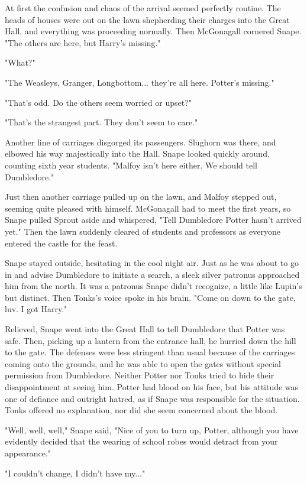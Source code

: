 \documentclass[a4paper,11pt]{article}
\begin{document}
At first the confusion and chaos of the arrival seemed perfectly routine. The heads of houses were out on the lawn shepherding their charges into the Great Hall, and everything was proceeding normally. Then McGonagall cornered Snape. "The others are here, but Harry's missing."

"What?"

"The Weasleys, Granger, Longbottom... they're all here. Potter's missing."

"That's odd. Do the others seem worried or upset?"

"That's the strangest part. They don't seem to care."

Another line of carriages disgorged its passengers. Slughorn was there, and elbowed his way majestically into the Hall. Snape looked quickly around, counting sixth year students. "Malfoy isn't here either. We should tell Dumbledore."

Just then another carriage pulled up on the lawn, and Malfoy stepped out, seeming quite pleased with himself. McGonagall had to meet the first years, so Snape pulled Sprout aside and whispered, "Tell Dumbledore Potter hasn't arrived yet." Then the lawn suddenly cleared of students and professors as everyone entered the castle for the feast.

Snape stayed outside, hesitating in the cool night air. Just as he was about to go in and advise Dumbledore to initiate a search, a sleek silver patronus approached him from the north. It was a patronus Snape didn't recognize, a little like Lupin's but distinct. Then Tonks's voice spoke in his brain. "Come on down to the gate, luv. I got Harry."

Relieved, Snape went into the Great Hall to tell Dumbledore that Potter was safe. Then, picking up a lantern from the entrance hall, he hurried down the hill to the gate. The defenses were less stringent than usual because of the carriages coming onto the grounds, and he was able to open the gates without special permission from Dumbledore. Neither Potter nor Tonks tried to hide their disappointment at seeing him. Potter had blood on his face, but his attitude was one of defiance and outright hatred, as if Snape was responsible for the situation. Tonks offered no explanation, nor did she seem concerned about the blood.

"Well, well, well," Snape said, "Nice of you to turn up, Potter, although you have evidently decided that the wearing of school robes would detract from your appearance."

"I couldn't change, I didn't have my..."
\end{document}
